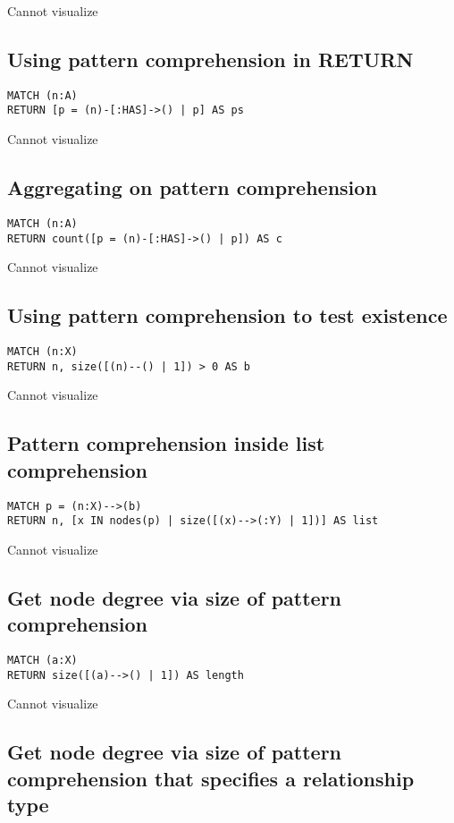 Cannot visualize
\subsection{Using pattern comprehension in RETURN}

\begin{lstlisting}
MATCH (n:A)
RETURN [p = (n)-[:HAS]->() | p] AS ps
\end{lstlisting}

Cannot visualize
\subsection{Aggregating on pattern comprehension}

\begin{lstlisting}
MATCH (n:A)
RETURN count([p = (n)-[:HAS]->() | p]) AS c
\end{lstlisting}

Cannot visualize
\subsection{Using pattern comprehension to test existence}

\begin{lstlisting}
MATCH (n:X)
RETURN n, size([(n)--() | 1]) > 0 AS b
\end{lstlisting}

Cannot visualize
\subsection{Pattern comprehension inside list comprehension}

\begin{lstlisting}
MATCH p = (n:X)-->(b)
RETURN n, [x IN nodes(p) | size([(x)-->(:Y) | 1])] AS list
\end{lstlisting}

Cannot visualize
\subsection{Get node degree via size of pattern comprehension}

\begin{lstlisting}
MATCH (a:X)
RETURN size([(a)-->() | 1]) AS length
\end{lstlisting}

Cannot visualize
\subsection{Get node degree via size of pattern comprehension that specifies a relationship type}

